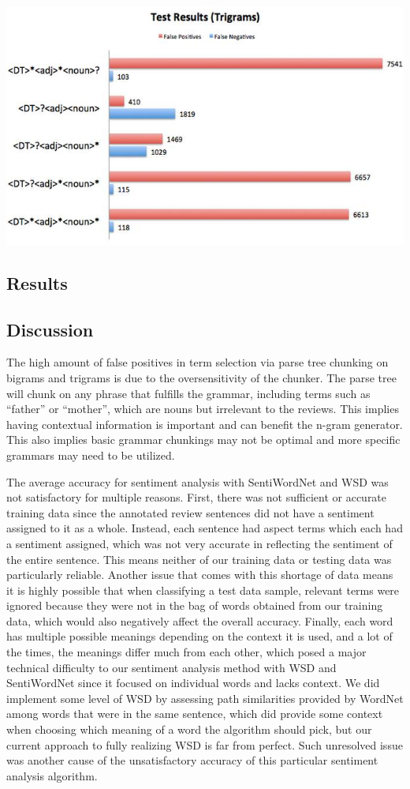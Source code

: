 \documentclass{article}
\begin{document}
\includegraphics[scale = 0.35]{trigramsFalse.jpg}

\subsection{Results}
\subsection{Discussion}
The high amount of false positives in term selection via parse tree chunking on bigrams and trigrams is due to the oversensitivity of the chunker. The parse tree will chunk on any phrase that fulfills the grammar, including terms such as “father” or “mother”, which are nouns but irrelevant to the reviews. This implies having contextual information is important and can benefit the n-gram generator. This also implies basic grammar chunkings may not be optimal and more specific grammars may need to be utilized.

The average accuracy for sentiment analysis with SentiWordNet and WSD was not satisfactory for multiple reasons. First, there was not sufficient or accurate training data since the annotated review sentences did not have a sentiment assigned to it as a whole. Instead, each sentence had aspect terms which each had a sentiment assigned, which was not very accurate in reflecting the sentiment of the entire sentence. This means neither of our training data or testing data was particularly reliable. Another issue that comes with this shortage of data means it is highly possible that when classifying a test data sample, relevant terms were ignored because they were not in the bag of words obtained from our training data, which would also negatively affect the overall accuracy. Finally, each word has multiple possible meanings depending on the context it is used, and a lot of the times, the meanings differ much from each other, which posed a major technical difficulty to our sentiment analysis method with WSD and SentiWordNet since it focused on individual words and lacks context. We did implement some level of WSD by assessing path similarities provided by WordNet among words that were in the same sentence, which did provide some context when choosing which meaning of a word the algorithm should pick, but our current approach to fully realizing WSD is far from perfect. Such unresolved issue was another cause of the unsatisfactory accuracy of this particular sentiment analysis algorithm.
\end{document}
